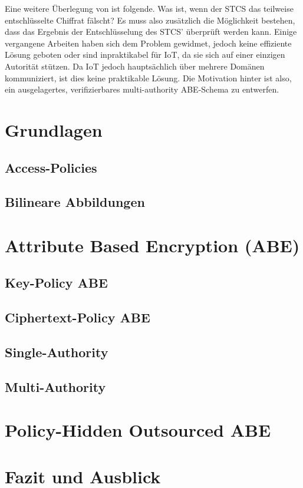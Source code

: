 \documentclass[format=sigconf]{acmart}
\begin{document}
	Eine weitere Überlegung von \cite{phoabe} ist folgende. Was ist, wenn der STCS
	das teilweise entschlüsselte Chiffrat fälscht? Es muss also zusätzlich die
	Möglichkeit bestehen, dass das Ergebnis der Entschlüsselung des STCS'
	überprüft werden kann. Einige vergangene Arbeiten haben sich dem Problem
	gewidmet, jedoch keine effiziente Lösung geboten oder sind inpraktikabel für
	IoT, da sie sich auf einer einzigen Autorität stützen. Da IoT jedoch
	hauptsächlich über mehrere Domänen kommuniziert, ist dies keine praktikable
	Lösung. Die Motivation hinter \cite{phoabe} ist also, ein ausgelagertes,
	verifizierbares multi-authority ABE-Schema zu entwerfen.
	
	\section{Grundlagen}
	\subsection{Access-Policies}
	\subsection{Bilineare Abbildungen}

	\section{Attribute Based Encryption (ABE)}
	\subsection{Key-Policy ABE}
	\subsection{Ciphertext-Policy ABE}
	\subsection{Single-Authority}
	\subsection{Multi-Authority}

	\section{Policy-Hidden Outsourced ABE}

	\section{Fazit und Ausblick}

	
	
\end{document}

